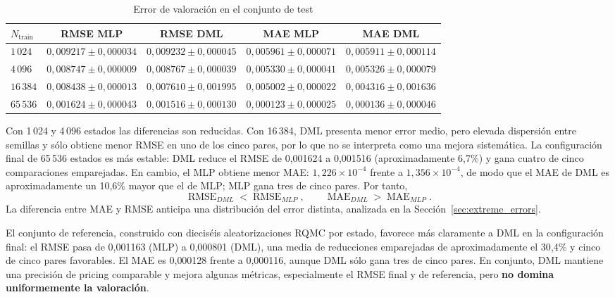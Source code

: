 \begin{table}[htbp]
\centering
\scriptsize
\setlength{\tabcolsep}{4pt}
\caption{Error de valoración en el conjunto de test}
\label{tab:pricing_test_results}
\begin{tabular}{lcccc}
\toprule
\textbf{$N_{\mathrm{train}}$}
& \textbf{RMSE MLP}
& \textbf{RMSE DML}
& \textbf{MAE MLP}
& \textbf{MAE DML} \\
\midrule
$1\,024$
& $0{,}009217 \pm 0{,}000034$
& $0{,}009232 \pm 0{,}000045$
& $0{,}005961 \pm 0{,}000071$
& $0{,}005911 \pm 0{,}000114$ \\
$4\,096$
& $0{,}008747 \pm 0{,}000009$
& $0{,}008767 \pm 0{,}000039$
& $0{,}005330 \pm 0{,}000041$
& $0{,}005326 \pm 0{,}000079$ \\
$16\,384$
& $0{,}008438 \pm 0{,}000013$
& $0{,}007610 \pm 0{,}001995$
& $0{,}005002 \pm 0{,}000022$
& $0{,}004316 \pm 0{,}001636$ \\
$65\,536$
& $0{,}001624 \pm 0{,}000043$
& $0{,}001516 \pm 0{,}000130$
& $0{,}000123 \pm 0{,}000025$
& $0{,}000136 \pm 0{,}000046$ \\
\bottomrule
\end{tabular}
\par{}
\end{table}

Con 1\,024 y 4\,096 estados las diferencias son reducidas. Con 16\,384,
DML presenta menor error medio, pero elevada dispersión entre semillas y sólo obtiene menor
RMSE en uno de los cinco pares, por lo que no se interpreta como una mejora sistemática.
La configuración final de 65\,536 estados es más estable: DML reduce el RMSE de
0{,}001624 a 0{,}001516 (aproximadamente 6{,}7\%) y gana cuatro de cinco
comparaciones emparejadas. En cambio, el MLP obtiene menor MAE:
$1{,}226\times10^{-4}$ frente a $1{,}356\times10^{-4}$, de modo que el MAE de DML es aproximadamente un 10{,}6\% mayor que el de MLP;
MLP gana tres de cinco pares. Por tanto,
\begin{equation}
    \operatorname{RMSE}_{DML}<\operatorname{RMSE}_{MLP},
    \qquad
    \operatorname{MAE}_{DML}>\operatorname{MAE}_{MLP}.
    \label{eq:pricing_mixed_result}
\end{equation}
La diferencia entre MAE y RMSE anticipa una distribución del error distinta, analizada en
la Sección~\ref{sec:extreme_errors}.

El conjunto de referencia, construido con dieciséis aleatorizaciones RQMC por estado,
favorece más claramente a DML en la configuración final: el RMSE pasa de 0{,}001163
(MLP) a 0{,}000801 (DML), una media de reducciones emparejadas de aproximadamente el 30{,}4\% y
cinco de cinco pares favorables. El MAE es 0{,}000128 frente a 0{,}000116, aunque DML
sólo gana tres de cinco pares. En conjunto, DML mantiene una precisión de pricing
comparable y mejora algunas métricas, especialmente el RMSE final y de referencia, pero
\textbf{no domina uniformemente la valoración}.

